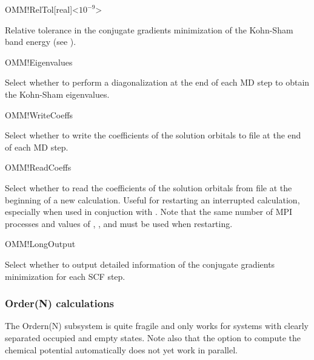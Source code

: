 \begin{fdfentry}{OMM!RelTol}[real]<$10^{-9}$>
  
  Relative tolerance in the conjugate gradients minimization of the
  Kohn-Sham band energy (see ).

\end{fdfentry}

\begin{fdflogicalF}{OMM!Eigenvalues}

  Select whether to perform a diagonalization at the end of each MD
  step to obtain the Kohn-Sham eigenvalues.

\end{fdflogicalF}

\begin{fdflogicalF}{OMM!WriteCoeffs}

  Select whether to write the coefficients of the solution orbitals to
  file at the end of each MD step.

\end{fdflogicalF}

\begin{fdflogicalF}{OMM!ReadCoeffs}

  Select whether to read the coefficients of the solution orbitals
  from file at the beginning of a new calculation. Useful for
  restarting an interrupted calculation, especially when used in
  conjuction with . Note that the same number of
  MPI processes and values of ,
  , and  must be used when
  restarting.

\end{fdflogicalF}


\begin{fdflogicalF}{OMM!LongOutput}
  
  Select whether to output detailed information of the conjugate
  gradients minimization for each SCF step.

\end{fdflogicalF}


\subsubsection{Order(N) calculations}
\label{SolverON}

The Ordern(N) subsystem is quite fragile and only works for systems
with clearly separated occupied and empty states. Note also that the
option to compute the chemical potential automatically does not yet
work in parallel.

